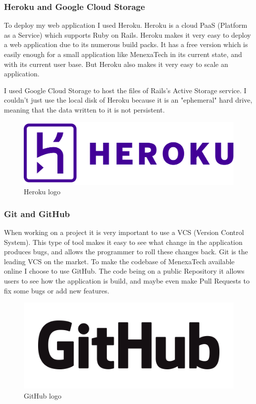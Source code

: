 \documentclass[12pt,a4paper]{article}
\begin{document}
\subsubsection{Heroku and Google Cloud Storage}
To deploy my web application I used Heroku. Heroku is a cloud PaaS (Platform as
a Service) which supports Ruby on Rails. Heroku makes it very easy to deploy a
web application due to its numerous build packs. It has a free version which is
easily enough for a small application like MenexaTech in its current state, and
with its current user base. But Heroku also makes it very easy to scale an
application.

I used Google Cloud Storage to host the files of Rails's Active Storage
service. I couldn't just use the local disk of Heroku because it is an
"ephemeral" hard drive, meaning that the data written to it is not persistent.

\begin{figure}[h]
   \centering
   \includegraphics[scale=0.05]{src/heroku_logo.png}
   \caption{\label{fig:hlogo} Heroku logo}
\end{figure}


\subsubsection{Git and GitHub}
When working on a project it is very important to use a VCS (Version Control
System). This type of tool makes it easy to see what change in the application
produces bugs, and allows the programmer to roll these changes back. Git is the
leading VCS on the market. To make the codebase of MenexaTech available online
I choose to use GitHub. The code being on a public Repository it allows users
to see how the application is build, and maybe even make Pull Requests to fix
some bugs or add new features.

\begin{figure}[h]
   \centering
   \includegraphics[scale=0.15]{src/github_logo.png}
   \caption{\label{fig:ghlogo} GitHub logo}
\end{figure}
\end{document}
